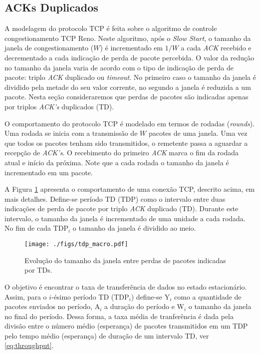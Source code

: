 
\subsection{ACKs Duplicados}
A modelagem do protocolo TCP é feita sobre o algoritmo de controle congestionamento TCP Reno.
Neste algoritmo, após o \textit{Slow Start}, o tamanho da janela de congestionamento ($W$) é 
incrementado em $1/W$ a cada \textit{ACK} recebido e decrementado a cada indicação de perda 
de pacote percebida. O valor da redução no tamanho da janela varia de acordo com o tipo de indicação de
perda de pacote: triplo \textit{ACK} duplicado ou \textit{timeout}. No primeiro caso o tamanho
da janela é dividido pela metade do seu valor corrente, no segundo a janela é reduzida a um 
pacote. Nesta seção consideraremos que perdas de pacotes são indicadas apenas por triplos 
\textit{ACK's} duplicados (TD).

O comportamento do protocolo TCP é modelado em termos de rodadas (\textit{rounds}). Uma rodada
se inicia com a transmissão de $W$ pacotes de uma janela. Uma vez que todos os pacotes tenham sido 
transmitidos, o remetente passa a aguardar a recepção de \textit{ACK's}. O recebimento do primeiro 
\textit{ACK} marca o fim da rodada atual e início da próxima. Note que a cada rodada o tamanho da 
janela é incrementado em um pacote.

A Figura \ref{fig:tdp_macro} apresenta o comportamento de uma conexão TCP, descrito acima, em mais detalhes. 
Define-se período TD (TDP) como o intervalo entre duas indicações de perda de pacote por triplo \textit{ACK} 
duplicado (TD). Durante este intervalo, o tamanho da janela é incrementado de uma unidade a cada rodada. 
No fim de cada TDP$_{i}$ o tamanho da janela é dividido ao meio.

\begin{figure}[ht]
  \centering
  \texttt{[image: ./figs/tdp\_macro.pdf]}
  \caption{Evolução do tamanho da janela entre perdas de pacotes indicadas por TDs.}
  \label{fig:tdp_macro}
\end{figure}

O objetivo é encontrar o taxa de transferência de dados no estado estacionário. Assim, para o $i$-ésimo 
período TD (TDP$_{i}$) define-se Y$_i$ como a quantidade de pacotes enviados no período, A$_i$ a duração 
do período e W$_i$ o tamanho da janela no final do período. Dessa forma, a taxa média de tranferência é
dada pela divisão entre o número médio (esperança) de pacotes transmitidos em um TDP pelo tempo médio 
(esperança) de duração de um intervalo TD, ver \eqref{eq:throughput}.

